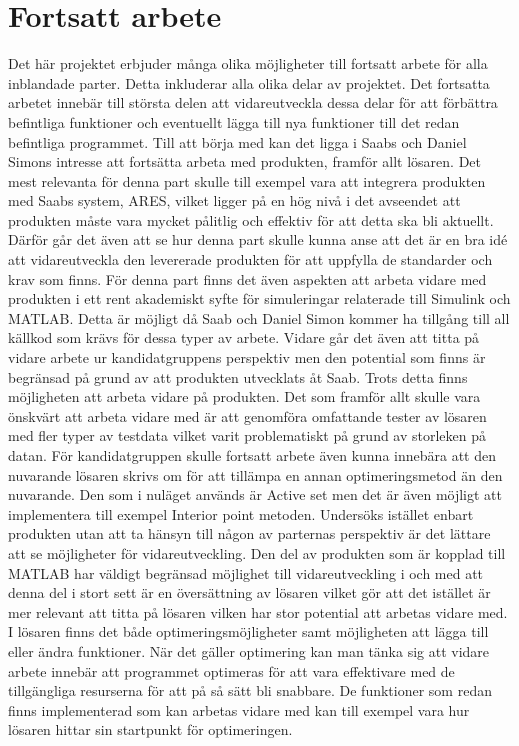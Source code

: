\section{Fortsatt arbete}
Det här projektet erbjuder många olika möjligheter till fortsatt arbete för alla inblandade parter. Detta inkluderar alla olika delar av projektet. Det fortsatta arbetet innebär till största delen att vidareutveckla dessa delar för att förbättra befintliga funktioner och eventuellt lägga till nya funktioner till det redan befintliga programmet. 
\newline \newline
Till att börja med kan det ligga i Saabs och Daniel Simons intresse att fortsätta arbeta med produkten, framför allt lösaren. Det mest relevanta för denna part skulle till exempel vara att integrera produkten med Saabs system, ARES, vilket ligger på en hög nivå i det avseendet att produkten måste vara mycket pålitlig och effektiv för att detta ska bli aktuellt. Därför går det även att se hur denna part skulle kunna anse att det är en bra idé att vidareutveckla den levererade produkten för att uppfylla de standarder och krav som finns. För denna part finns det även aspekten att arbeta vidare med produkten i ett rent akademiskt syfte för simuleringar relaterade till Simulink och MATLAB. Detta är möjligt då Saab och Daniel Simon kommer ha tillgång till all källkod som krävs för dessa typer av arbete.
\newline \newline
Vidare går det även att titta på vidare arbete ur kandidatgruppens perspektiv men den potential som finns är begränsad på grund av att produkten utvecklats åt Saab. Trots detta finns möjligheten att arbeta vidare på produkten. Det som framför allt skulle vara önskvärt att arbeta vidare med är att genomföra omfattande tester av lösaren med fler typer av testdata vilket varit problematiskt på grund av storleken på datan. För kandidatgruppen skulle fortsatt arbete även kunna innebära att den nuvarande lösaren skrivs om för att tillämpa en annan optimeringsmetod än den nuvarande. Den som i nuläget används är Active set men det är även möjligt att implementera till exempel Interior point metoden.
\newline \newline
Undersöks istället enbart produkten utan att ta hänsyn till någon av parternas perspektiv är det lättare att se möjligheter för vidareutveckling. Den del av produkten som är kopplad till MATLAB har väldigt begränsad möjlighet till vidareutveckling i och med att denna del i stort sett är en översättning av lösaren vilket gör att det istället är mer relevant att titta på lösaren vilken har stor potential att arbetas vidare med. I lösaren finns det både optimeringsmöjligheter samt möjligheten att lägga till eller ändra funktioner. När det gäller optimering kan man tänka sig att vidare arbete innebär att programmet optimeras för att vara effektivare med de tillgängliga resurserna för att på så sätt bli snabbare. De funktioner som redan finns implementerad som kan arbetas vidare med kan till exempel vara hur lösaren hittar sin startpunkt för optimeringen.
